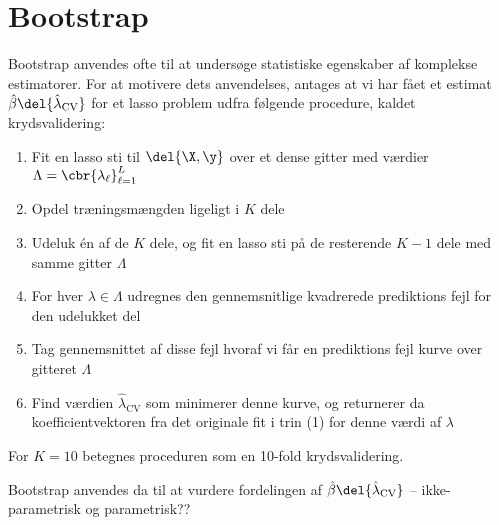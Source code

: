 \section{Bootstrap}
Bootstrap anvendes ofte til at undersøge statistiske egenskaber af komplekse estimatorer.
For at motivere dets anvendelses, antages at vi har fået et estimat \(\hat{\beta} \del{\hat{\lambda}_{\text{CV}}}\) for et lasso problem udfra følgende procedure, kaldet krydsvalidering:
%
\begin{enumerate}
\item Fit en lasso sti til \(\del{\X, \y}\) over et dense gitter med værdier \(\Lambda = \cbr{\lambda_\ell}_{\ell=1}^L\)
\item Opdel træningsmængden ligeligt i \(K\) dele
\item Udeluk én af de \(K\) dele, og fit en lasso sti på de resterende \(K-1\) dele med samme gitter \(\Lambda\)
\item For hver \(\lambda \in \Lambda\) udregnes den gennemsnitlige kvadrerede prediktions fejl for den udelukket del
\item Tag gennemsnittet af disse fejl hvoraf vi får en prediktions fejl kurve over gitteret \(\Lambda\)
\item Find værdien \(\hat{\lambda}_{\text{CV}}\) som minimerer denne kurve, og returnerer da koefficientvektoren fra det originale fit i trin (1) for denne værdi af $\lambda$
\end{enumerate}
For \(K=10\) betegnes proceduren som en 10-fold krydsvalidering.

Bootstrap anvendes da til at vurdere fordelingen af \(\hat{\beta} \del{\hat{\lambda}_{\text{CV}}}\) -- ikke-parametrisk og parametrisk??